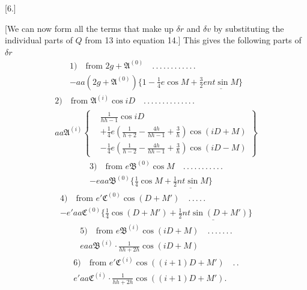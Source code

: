 \par\bigskip
\hypertarget{native-395}{}
\begin{center}[6.]\end{center}
\noindent\hspace*{\parindent}[We can now form all the terms that make up \(\delta r\) and \(\delta v\) by substituting the individual parts of \(Q\) from 13 into equation 14.] This gives the following parts of \(\delta r\)
\[
\begin{gathered}
1)\quad\text{from }2g+\mathfrak A^{(0)}\quad .\, .\, .\, .\, .\, .\, .\, .\, .\, .\, .\, .\\[.5ex]
-aa(2g+\mathfrak A^{(0)})\{1-\tfrac14e\cos M+\underline{\tfrac32ent\sin M\}}
\end{gathered}
\]
\[
\begin{gathered}
2)\quad\text{from }\mathfrak A^{(i)}\cos iD\quad .\, .\, .\, .\, .\, .\, .\, .\, .\, .\, .\, .\, .\, .\\[.5ex]
aa\mathfrak A^{(i)}\left\{\begin{aligned}
&\frac1{hh-1}\cos iD\\
&+\tfrac14e\left(\frac1{h+2}-\frac{4h}{hh-1}+\frac3h\right)\cos(iD+M)\\
&-\tfrac14e\left(\frac1{h-2}-\frac{4h}{hh-1}+\frac3h\right)\cos(iD-M)
\end{aligned}\right\}
\end{gathered}
\]
\[
\begin{gathered}
3)\quad\text{from }e\mathfrak B^{(0)}\cos M\quad .\, .\, .\, .\, .\, .\, .\, .\, .\, .\, .\\[.5ex]
-eaa\mathfrak B^{(0)}\{\tfrac14\cos M+\underline{\tfrac12nt\sin M}\}
\end{gathered}
\]
\[
\begin{gathered}
4)\quad\text{from }e'\mathfrak C^{(0)}\cos(D+M')\quad .\, .\, .\, .\, .\\[.5ex]
-e'aa\mathfrak C^{(0)}\{\tfrac14\cos(D+M')+\underline{\tfrac12nt\sin(D+M')}\}
\end{gathered}
\]
\[
\begin{gathered}
5)\quad\text{from }e\mathfrak B^{(i)}\cos(iD+M)\quad .\, .\, .\, .\, .\, .\, .\\[.5ex]
eaa\mathfrak B^{(i)}\cdot\frac1{hh+2h}\cos(iD+M)
\end{gathered}
\]
\[
\begin{gathered}
6)\quad\text{from }e'\mathfrak C^{(i)}\cos((i+1)D+M')\quad .\, .\\[.5ex]
e'aa\mathfrak C^{(i)}\cdot\frac1{hh+2h}\cos((i+1)D+M').
\end{gathered}
\]

